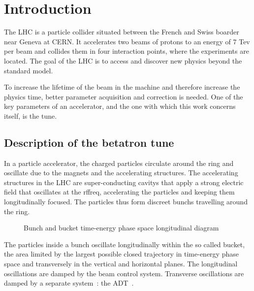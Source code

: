 %

\glsresetall

\chapter{Introduction}

The \gls{LHC} is a particle collider situated between the French and Swiss boarder near Geneva at \gls{CERN}. It accelerates two beams of protons to an energy of 7 Tev per beam and collides them in four interaction points, where the experiments are located. The goal of the \gls{LHC} is to access and discover new physics beyond the standard model.

To increase the lifetime of the beam in the machine and therefore increase the physics time, better parameter acquisition and correction is needed. One of the key parameters of an accelerator, and the one with which this work concerns itself, is the \gls{tune}.

\section{Description of the betatron tune}

In a particle accelerator, the charged particles circulate around the ring and oscillate due to the magnets and the accelerating structures. The accelerating structures in the \gls{LHC} are super-conducting \glspl{cavity} that apply a strong electric field that oscillates at the \gls{rffreq}, accelerating the particles and keeping them longitudinally focused. The particles thus form discreet \glspl{bunch} travelling around the ring.

\begin{figure}[H]
\centering
\caption{Bunch and bucket time-energy phase space longitudinal diagram}
\end{figure}

The particles inside a bunch oscillate longitudinally within the so called bucket, the area limited by the largest possible closed trajectory in time-energy phase space and transversely in the vertical and horizontal planes. The longitudinal oscillations are damped by the beam control system. Transverse oscillations are damped by a separate system~: the \gls{ADT}~\cite{Zhabitsky:1141925,Benews11}.

